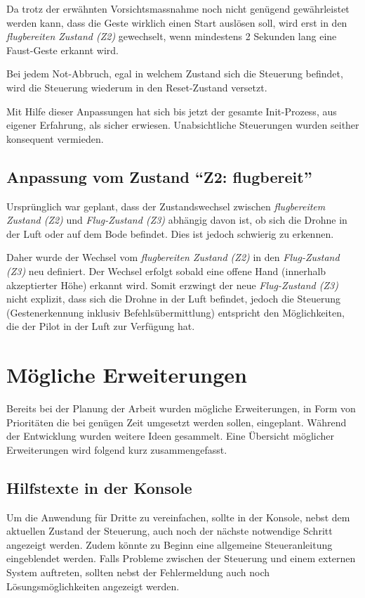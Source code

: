 Da trotz der erwähnten Vorsichtsmassnahme noch nicht genügend gewährleistet werden kann, dass die Geste wirklich einen Start auslösen soll, wird erst in den \textit{flugbereiten Zustand (Z2)} gewechselt, wenn mindestens 2 Sekunden lang eine Faust-Geste erkannt wird.

Bei jedem Not-Abbruch, egal in welchem Zustand sich die Steuerung befindet, wird die Steuerung wiederum in den Reset-Zustand versetzt.

Mit Hilfe dieser Anpassungen hat sich bis jetzt der gesamte Init-Prozess, aus eigener Erfahrung, als sicher erwiesen.
Unabsichtliche Steuerungen wurden seither konsequent vermieden.

\subsection{Anpassung vom Zustand "`Z2: flugbereit"'}
Ursprünglich war geplant, dass der Zustandswechsel zwischen \textit{flugbereitem Zustand (Z2)} und \textit{Flug-Zustand (Z3)} abhängig davon ist, ob sich die Drohne in der Luft oder auf dem Bode befindet.
Dies ist jedoch schwierig zu erkennen.

Daher wurde der Wechsel vom \textit{flugbereiten Zustand (Z2)} in den \textit{Flug-Zustand (Z3)} neu definiert.
Der Wechsel erfolgt sobald eine offene Hand (innerhalb akzeptierter Höhe) erkannt wird.
Somit erzwingt der neue \textit{Flug-Zustand (Z3)} nicht explizit, dass sich die Drohne in der Luft befindet, jedoch die Steuerung (Gestenerkennung inklusiv Befehlsübermittlung) entspricht den Möglichkeiten, die der Pilot in der Luft zur Verfügung hat.



\section{Mögliche Erweiterungen}
Bereits bei der Planung der Arbeit wurden mögliche Erweiterungen, in Form von Prioritäten die bei genügen Zeit umgesetzt werden sollen, eingeplant.
Während der Entwicklung wurden weitere Ideen gesammelt.
Eine Übersicht möglicher Erweiterungen wird folgend kurz zusammengefasst.

\subsection{Hilfstexte in der Konsole}
Um die Anwendung für Dritte zu vereinfachen, sollte in der Konsole, nebst dem aktuellen Zustand der Steuerung, auch noch der nächste notwendige Schritt angezeigt werden.
Zudem könnte zu Beginn eine allgemeine Steueranleitung eingeblendet werden.
Falls Probleme zwischen der Steuerung und einem externen System auftreten, sollten nebst der Fehlermeldung auch noch Lösungsmöglichkeiten angezeigt werden.

